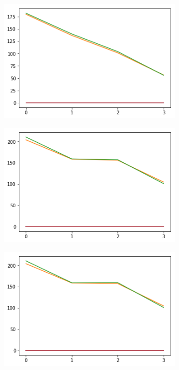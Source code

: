 \begin{figure}[h!]
  \begin{subfigure}[b]{0.3\linewidth}
    \includegraphics[width=\linewidth]{images/subst2/ef0_means.png}
    \caption{}
  \end{subfigure}
  \begin{subfigure}[b]{0.3\linewidth}
    \includegraphics[width=\linewidth]{images/subst2/ef1_means.png}
    \caption{}
  \end{subfigure}
  \begin{subfigure}[b]{0.3\linewidth}
    \includegraphics[width=\linewidth]{images/subst2/ef2_means.png}

\end{subfigure}
\end{figure}

